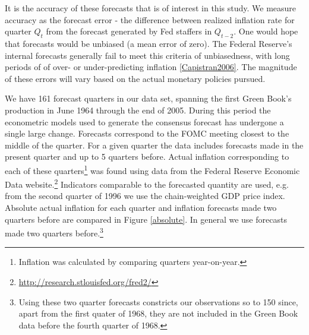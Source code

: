 \documentclass[a4paper]{article}\usepackage{graphicx, color}
\begin{document}
It is the accuracy of these forecasts that is of interest in this study. We measure accuracy as the forecast error - the difference between realized inflation rate for quarter $Q_t$ from the forecast generated by Fed staffers in $Q_{t-2}$.  One would hope that forecasts would be unbiased (a mean error of zero). The Federal Reserve's internal forecasts generally fail to meet this criteria of unbiasedness, with long periods of of over- or under-predicting inflation \ref{Capistran2006}. The magnitude of these errors will vary based on the actual monetary policies pursued. 

We have 161 forecast quarters in our data set, spanning the first Green Book's production in June 1964 through the end of 2005. During this period the econometric models used to generate the consensus forecast has undergone a single large change. Forecasts correspond to the FOMC meeting closest to the middle of the quarter. For a given quarter the data includes forecasts made in the present quarter and up to 5 quarters before. Actual inflation corresponding to each of these quarters\footnote{Inflation was calculated by comparing quarters year-on-year.} was found using data from the Federal Reserve Economic Data website.\footnote{\url{http://research.stlouisfed.org/fred2/}} Indicators comparable to the forecasted quantity are used, e.g. from the second quarter of 1996 we use the chain-weighted GDP price index. Absolute actual inflation for each quarter and inflation forecasts made two quarters before are compared in Figure \ref{absolute}. In general we use forecasts made two quarters before.\footnote{Using these two quarter forecasts constricts our observations so to 150 since, apart from the first quater of 1968, they are not included in the Green Book data before the fourth quarter of 1968.} 
\end{document}
